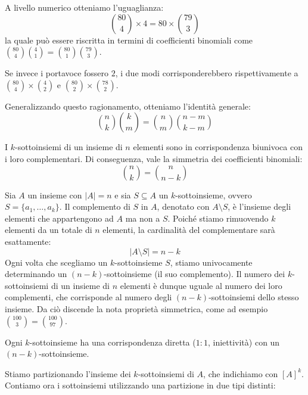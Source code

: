 \documentclass[12pt]{report}
\begin{document}
	A livello numerico otteniamo l'uguaglianza:
	\[
		\binom{80}{4} \times 4 = 80 \times \binom{79}{3}
	\]
	la quale può essere riscritta in termini di coefficienti binomiali come $\binom{80}{4} \binom{4}{1} = \binom{80}{1} \binom{79}{3}$.
	
	Se invece i portavoce fossero $2$, i due modi corrisponderebbero rispettivamente a $\binom{80}{4} \times \binom{4}{2}$ e $\binom{80}{2} \times \binom{78}{2}$.
	
	Generalizzando questo ragionamento, otteniamo l'identità generale:
	\[
		\binom{n}{k} \binom{k}{m} = \binom{n}{m} \binom{n-m}{k-m}
	\]
	
	\begin{proposizione}{}{}
		
		I $k$-sottoinsiemi di un insieme di $n$ elementi sono in corrispondenza biunivoca con i loro complementari. Di conseguenza, vale la simmetria dei coefficienti binomiali:
		\[
			\binom{n}{k} = \binom{n}{n-k}
		\]
		
	\end{proposizione}
	
	\begin{dimostrazione}{}{}
		
		Sia $A$ un insieme con $|A| = n$ e sia $S \subseteq A$ un $k$-sottoinsieme, ovvero $S = \{a_1, \dots, a_k\}$. 
		Il complemento di $S$ in $A$, denotato con $A \setminus S$, è l'insieme degli elementi che appartengono ad $A$ ma non a $S$. 
		Poiché stiamo rimuovendo $k$ elementi da un totale di $n$ elementi, la cardinalità del complementare sarà esattamente:
		\[
		|A \setminus S| = n - k
		\]
		Ogni volta che scegliamo un $k$-sottoinsieme $S$, stiamo univocamente determinando un $(n-k)$-sottoinsieme (il suo complemento). 
		Il numero dei $k$-sottoinsiemi di un insieme di $n$ elementi è dunque uguale al numero dei loro complementi, che corrisponde al numero degli $(n-k)$-sottoinsiemi dello stesso insieme.
		Da ciò discende la nota proprietà simmetrica, come ad esempio $\binom{100}{3} = \binom{100}{97}$.
		
	\end{dimostrazione}
	
	\begin{osservazione}{}{}
		
		Ogni $k$-sottoinsieme ha una corrispondenza diretta ($1:1$, iniettività) con un $(n-k)$-sottoinsieme.
		
	\end{osservazione}
	
	Stiamo partizionando l'insieme dei $k$-sottoinsiemi di $A$, che indichiamo con $[A]^k$.
	Contiamo ora i sottoinsiemi utilizzando una partizione in due tipi distinti:
	
\end{document}
